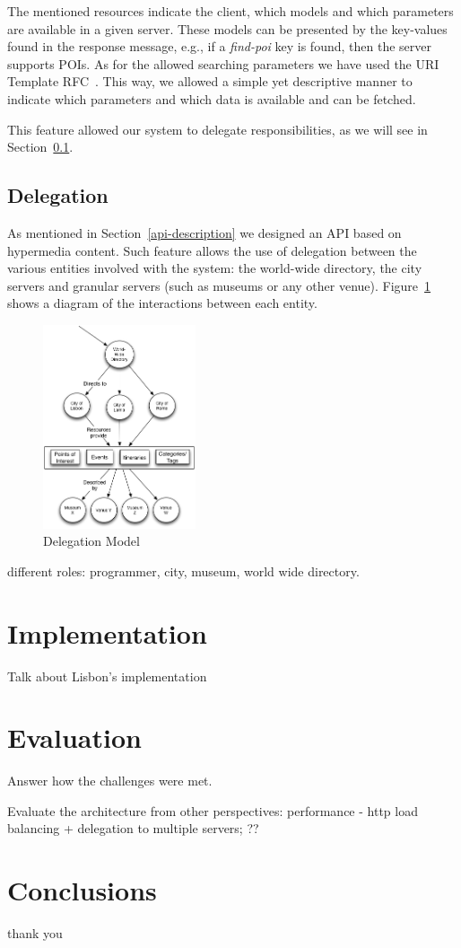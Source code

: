 \documentclass[times]{ettauth}
\begin{document}
The mentioned resources indicate the client, which models and which parameters are available in a given server. These models can be presented by the key-values found in the response message, e.g., if a \textit{find-poi} key is found, then the server supports POIs. As for the allowed searching parameters we have used the URI Template RFC~\cite{uri-template}. This way, we allowed a simple yet descriptive manner to indicate which parameters and which data is available and can be fetched.

This feature allowed our system to delegate responsibilities, as we will see in Section~\ref{delegation}.

\subsection{Delegation}
\label{delegation}
As mentioned in Section~\ref{api-description} we designed an API based on hypermedia content. Such feature allows the use of delegation between the various entities involved with the system: the world-wide directory, the city servers and granular servers (such as museums or any other venue). Figure~\ref{fig:delegation} shows a diagram of the interactions between each entity.

\begin{figure}[!ht]
\centering
\includegraphics[width=0.4\textwidth]{images/delegation}
\caption{Delegation Model}
\label{fig:delegation}
\end{figure}


different roles: programmer, city, museum, world wide directory.


\section{Implementation}
Talk about Lisbon's implementation



\section{Evaluation}
Answer how the challenges were met.

Evaluate the architecture from other perspectives: performance - http load balancing + delegation to multiple servers; ??



\section{Conclusions}


\acks
thank you



\end{document}
